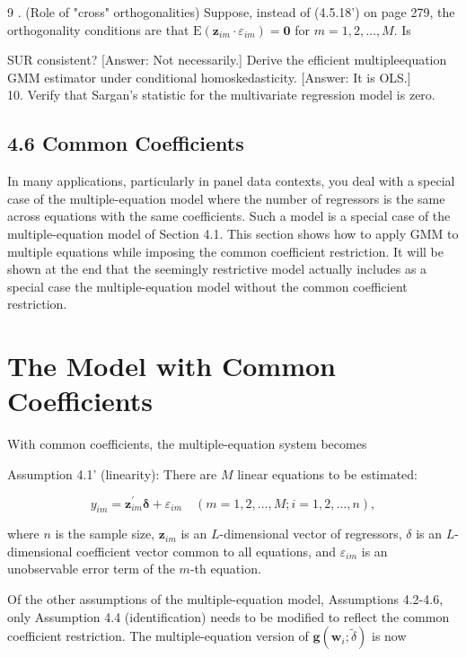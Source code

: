 \documentclass[10pt]{article}
\begin{document}
9 . (Role of "cross" orthogonalities) Suppose, instead of (4.5.18') on page 279, the orthogonality conditions are that $\mathrm{E}\left(\mathbf{z}_{i m} \cdot \varepsilon_{i m}\right)=\mathbf{0}$ for $m=1,2, \ldots, M$. Is

SUR consistent? [Answer: Not necessarily.] Derive the efficient multipleequation GMM estimator under conditional homoskedasticity. [Answer: It is OLS.]\\
10. Verify that Sargan's statistic for the multivariate regression model is zero.

\subsection*{4.6 Common Coefficients}
In many applications, particularly in panel data contexts, you deal with a special case of the multiple-equation model where the number of regressors is the same across equations with the same coefficients. Such a model is a special case of the multiple-equation model of Section 4.1. This section shows how to apply GMM to multiple equations while imposing the common coefficient restriction. It will be shown at the end that the seemingly restrictive model actually includes as a special case the multiple-equation model without the common coefficient restriction.

\section*{The Model with Common Coefficients}
With common coefficients, the multiple-equation system becomes

Assumption 4.1' (linearity): There are $M$ linear equations to be estimated:


\begin{equation*}
y_{i m}=\mathbf{z}_{i m}^{\prime} \boldsymbol{\delta}+\varepsilon_{i m} \quad(m=1,2, \ldots, M ; i=1,2, \ldots, n), \tag{4.6.1}
\end{equation*}


where $n$ is the sample size, $\mathbf{z}_{i m}$ is an $L$-dimensional vector of regressors, $\delta$ is an $L$-dimensional coefficient vector common to all equations, and $\varepsilon_{i m}$ is an unobservable error term of the $m$-th equation.

Of the other assumptions of the multiple-equation model, Assumptions 4.2-4.6, only Assumption 4.4 (identification) needs to be modified to reflect the common coefficient restriction. The multiple-equation version of $\mathbf{g}\left(\mathbf{w}_{i} ; \tilde{\delta}\right)$ is now
\end{document}
